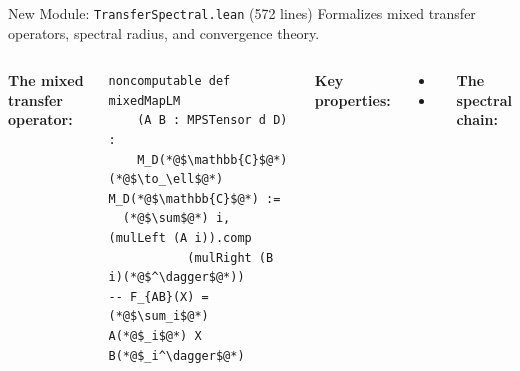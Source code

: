 \documentclass[aspectratio=169,10pt]{beamer}
\begin{document}
\begin{frame}[fragile]{New Module: \texttt{TransferSpectral.lean} (572 lines)}
\vspace{-0.5em}
{\small Formalizes mixed transfer operators, spectral radius, and convergence theory.}

\vspace{0.2em}
\begin{columns}[T]
\textbf{The mixed transfer operator:}
\begin{lstlisting}[basicstyle=\ttfamily\fontsize{5.5}{7}\selectfont\color{white}]
noncomputable def mixedMapLM
    (A B : MPSTensor d D) :
    M_D(*@$\mathbb{C}$@*) (*@$\to_\ell$@*) M_D(*@$\mathbb{C}$@*) :=
  (*@$\sum$@*) i, (mulLeft (A i)).comp
           (mulRight (B i)(*@$^\dagger$@*))
-- F_{AB}(X) = (*@$\sum_i$@*) A(*@$_i$@*) X B(*@$_i^\dagger$@*)
\end{lstlisting}

\vspace{0.2em}
\textbf{Key properties:}
\begin{itemize}\itemsep0.05em
  \item {\small {}}
  \item {\small {}}
\end{itemize}

\textbf{The spectral chain:}


\end{columns}
\end{frame}
\end{document}
